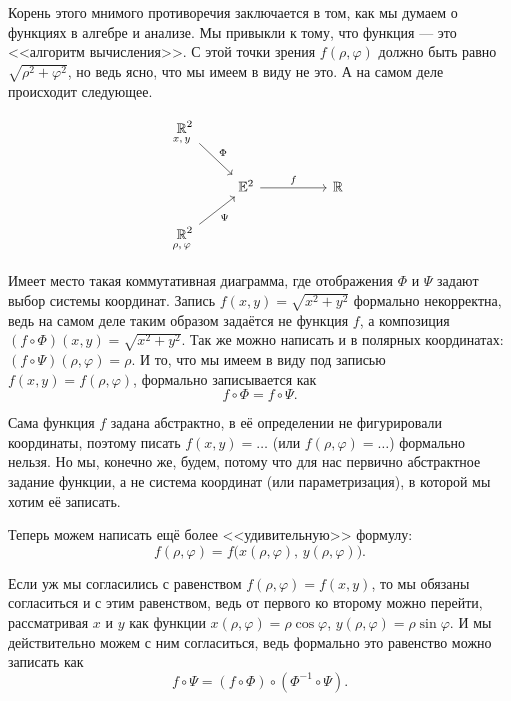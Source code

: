 
Корень этого мнимого противоречия заключается в том, как мы думаем о функциях в алгебре и анализе. Мы привыкли к тому, что функция --- это <<алгоритм вычисления>>. С этой точки зрения $f(\rho, \varphi)$ должно быть равно $\sqrt{\rho^2 + \varphi^2}$, но ведь ясно, что мы имеем в виду не это. А на самом деле происходит следующее.

%
\[\begin{tikzcd}
	{\underset{\mathclap{x,\,y}}{\mathbb{R}}^2} \\
	& {\mathbb{E}^2} && {\mathbb{R}} \\
	{\underset{\mathclap{\rho,\,\varphi}}{\mathbb{R}}^2}
	\arrow["\Phi", from=1-1, to=2-2]
	\arrow["f", from=2-2, to=2-4]
	\arrow["\Psi"', from=3-1, to=2-2]
\end{tikzcd}\]
%

Имеет место такая коммутативная диаграмма, где отображения $\Phi$ и $\Psi$ задают выбор системы координат. Запись $f(x, y) = \sqrt{x^2 + y^2}$ формально некорректна, ведь на самом деле таким образом задаётся не функция $f$, а композиция $(f \circ \Phi)(x, y) = \sqrt{x^2 + y^2}$. Так же можно написать и в полярных координатах: $(f \circ \Psi)(\rho, \varphi) = \rho$. И то, что мы имеем в виду под записью $f(x, y) = f(\rho, \varphi)$, формально записывается как
\[
	f \circ \Phi = f \circ \Psi.
\]

Сама функция $f$ задана абстрактно, в её определении не фигурировали координаты, поэтому писать $f(x, y) = \ldots$ (или $f(\rho, \varphi) = \ldots$) формально нельзя. Но мы, конечно же, будем, потому что для нас первично абстрактное задание функции, а не система координат (или параметризация), в которой мы хотим её записать.

Теперь можем написать ещё более <<удивительную>> формулу:
\[
	f(\rho, \varphi) = f\big(x(\rho, \varphi),\,y(\rho, \varphi)\big).
\]

Если уж мы согласились с равенством $f(\rho, \varphi) = f(x, y)$, то мы обязаны согласиться и с этим равенством, ведь от первого ко второму можно перейти, рассматривая $x$ и $y$ как функции $x(\rho, \varphi) = \rho\cos\varphi$, $y(\rho, \varphi) = \rho\sin\varphi$. И мы действительно можем с ним согласиться, ведь формально это равенство можно записать как
\[
	f \circ \Psi = (f \circ \Phi) \circ (\Phi^{-1} \circ \Psi).
\]

